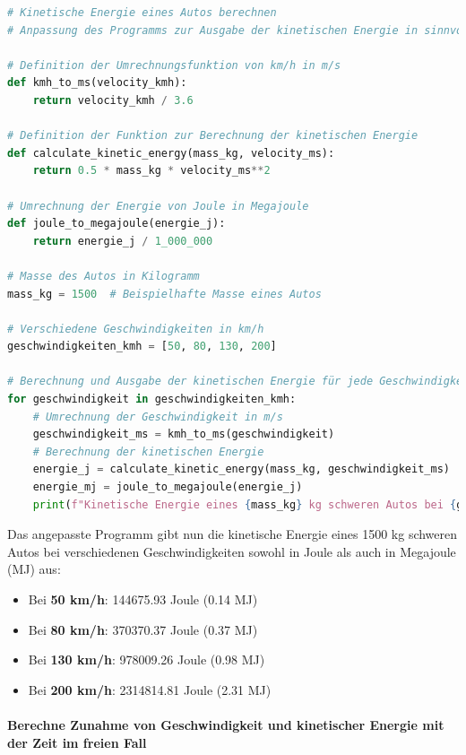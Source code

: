 \documentclass{vorlage-design-main}
\begin{document}
\begin{lstlisting}[language=Python]
# Kinetische Energie eines Autos berechnen
# Anpassung des Programms zur Ausgabe der kinetischen Energie in sinnvollen Einheitengrößen (Joule und Megajoule)

# Definition der Umrechnungsfunktion von km/h in m/s
def kmh_to_ms(velocity_kmh):
    return velocity_kmh / 3.6

# Definition der Funktion zur Berechnung der kinetischen Energie
def calculate_kinetic_energy(mass_kg, velocity_ms):
    return 0.5 * mass_kg * velocity_ms**2

# Umrechnung der Energie von Joule in Megajoule
def joule_to_megajoule(energie_j):
    return energie_j / 1_000_000

# Masse des Autos in Kilogramm
mass_kg = 1500  # Beispielhafte Masse eines Autos

# Verschiedene Geschwindigkeiten in km/h
geschwindigkeiten_kmh = [50, 80, 130, 200]

# Berechnung und Ausgabe der kinetischen Energie für jede Geschwindigkeit in Joule und Megajoule
for geschwindigkeit in geschwindigkeiten_kmh:
    # Umrechnung der Geschwindigkeit in m/s
    geschwindigkeit_ms = kmh_to_ms(geschwindigkeit)
    # Berechnung der kinetischen Energie
    energie_j = calculate_kinetic_energy(mass_kg, geschwindigkeit_ms)
    energie_mj = joule_to_megajoule(energie_j)
    print(f"Kinetische Energie eines {mass_kg} kg schweren Autos bei {geschwindigkeit} km/h: {energie_j:.2f} Joule ({energie_mj:.2f} MJ)")
\end{lstlisting}

Das angepasste Programm gibt nun die kinetische Energie eines 1500 kg
schweren Autos bei verschiedenen Geschwindigkeiten sowohl in Joule als
auch in Megajoule (MJ) aus:

\begin{itemize}

\item
  Bei \textbf{50 km/h}: 144675.93 Joule (0.14 MJ)
\item
  Bei \textbf{80 km/h}: 370370.37 Joule (0.37 MJ)
\item
  Bei \textbf{130 km/h}: 978009.26 Joule (0.98 MJ)
\item
  Bei \textbf{200 km/h}: 2314814.81 Joule (2.31 MJ)
\end{itemize}

\hypertarget{berechne-zunahme-von-geschwindigkeit-und-kinetischer-energie-mit-der-zeit-im-freien-fall}{%
\paragraph{Berechne Zunahme von Geschwindigkeit und kinetischer Energie
mit der Zeit im freien
Fall}\label{berechne-zunahme-von-geschwindigkeit-und-kinetischer-energie-mit-der-zeit-im-freien-fall}}
\end{document}
